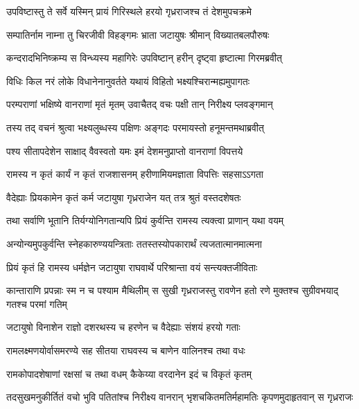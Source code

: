 
\twolineshloka
{उपविष्टास्तु ते सर्वे यस्मिन् प्रायं गिरिस्थले}
{हरयो गृध्रराजश्च तं देशमुपचक्रमे} %

\twolineshloka
{सम्पातिर्नाम नाम्ना तु चिरजीवी विहङ्गमः}
{भ्राता जटायुषः श्रीमान् विख्यातबलपौरुषः} %

\twolineshloka
{कन्दरादभिनिष्क्रम्य स विन्ध्यस्य महागिरेः}
{उपविष्टान् हरीन् दृष्ट्वा हृष्टात्मा गिरमब्रवीत्} %

\twolineshloka
{विधिः किल नरं लोके विधानेनानुवर्तते}
{यथायं विहितो भक्ष्यश्चिरान्मह्यमुपागतः} %

\twolineshloka
{परम्पराणां भक्षिष्ये वानराणां मृतं मृतम्}
{उवाचैतद् वचः पक्षी तान् निरीक्ष्य प्लवङ्गमान्} %

\twolineshloka
{तस्य तद् वचनं श्रुत्वा भक्ष्यलुब्धस्य पक्षिणः}
{अङ्गदः परमायस्तो हनूमन्तमथाब्रवीत्} %

\twolineshloka
{पश्य सीतापदेशेन साक्षाद् वैवस्वतो यमः}
{इमं देशमनुप्राप्तो वानराणां विपत्तये} %

\twolineshloka
{रामस्य न कृतं कार्यं न कृतं राजशासनम्}
{हरीणामियमज्ञाता विपत्तिः सहसाऽऽगता} %

\twolineshloka
{वैदेह्याः प्रियकामेन कृतं कर्म जटायुषा}
{गृध्रराजेन यत् तत्र श्रुतं वस्तदशेषतः} %

\twolineshloka
{तथा सर्वाणि भूतानि तिर्यग्योनिगतान्यपि}
{प्रियं कुर्वन्ति रामस्य त्यक्त्वा प्राणान् यथा वयम्} %

\twolineshloka
{अन्योन्यमुपकुर्वन्ति स्नेहकारुण्ययन्त्रिताः}
{ततस्तस्योपकारार्थं त्यजतात्मानमात्मना} %

\twolineshloka
{प्रियं कृतं हि रामस्य धर्मज्ञेन जटायुषा}
{राघवार्थे परिश्रान्ता वयं सन्त्यक्तजीविताः} %

\threelineshloka
{कान्ताराणि प्रपन्नाः स्म न च पश्याम मैथिलीम्}
{स सुखी गृध्रराजस्तु रावणेन हतो रणे}
{मुक्तश्च सुग्रीवभयाद् गतश्च परमां गतिम्} %

\twolineshloka
{जटायुषो विनाशेन राज्ञो दशरथस्य च}
{हरणेन च वैदेह्याः संशयं हरयो गताः} %

\twolineshloka
{रामलक्ष्मणयोर्वासमरण्ये सह सीतया}
{राघवस्य च बाणेन वालिनश्च तथा वधः} %

\twolineshloka
{रामकोपादशेषाणां रक्षसां च तथा वधम्}
{कैकेय्या वरदानेन इदं च विकृतं कृतम्} %

\twolineshloka
{तदसुखमनुकीर्तितं वचो भुवि पतितांश्च निरीक्ष्य वानरान्}
{भृशचकितमतिर्महामतिः कृपणमुदाहृतवान् स गृध्रराजः} %

